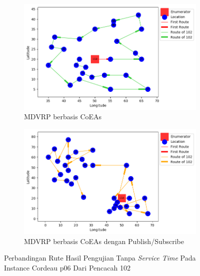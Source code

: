 \begin{figure}[H]
	\centering
	\begin{subfigure}[t]{\textwidth}
		\centering
		\includegraphics[width=\textwidth]{Resources/Images/cordeau_p06/cordeau_p06_notw_102_coes}
		\caption{MDVRP berbasis CoEAs}
		\label{fig:cordeau_p06_notw_102_coes}
	\end{subfigure}
	\begin{subfigure}[t]{\textwidth}
		\centering
		\includegraphics[width=\textwidth]{Resources/Images/cordeau_p06/cordeau_p06_notw_102_pubsub_coes}
		\caption{MDVRP berbasis CoEAs dengan Publish/Subscribe}
		\label{fig:cordeau_p06_notw_102_pubsub_coes}
	\end{subfigure}
	\caption{Perbandingan Rute Hasil Pengujian Tanpa \textit{Service Time} Pada Instance Cordeau p06 Dari Pencacah 102}
	\label{fig:cordeau_p06_notw_102}
\end{figure}


